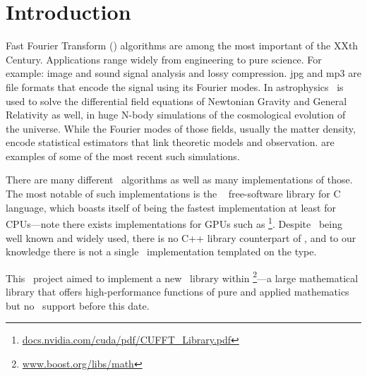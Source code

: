 \section{Introduction}

Fast Fourier Transform (\fft) algorithms are among the most important of the XXth
Century. Applications range widely from engineering to pure science.
For example: image and sound signal analysis and lossy compression.
jpg and mp3 are file formats that encode the signal using its Fourier modes.
In astrophysics \fft\ is used to solve the differential field
equations of Newtonian Gravity and General Relativity as well, in huge N-body
simulations of the cosmological evolution of the universe. While the Fourier
modes of those fields, usually the matter density, encode statistical estimators
that link theoretic models and observation. \cite{adamek_2016,springel_2020} are
examples of some of the most recent such simulations.

There are many different \fft\ algorithms as well as many implementations of
those. The most notable of such implementations is the \fftw\ \cite{FFTW05}
free-software library for C language, which boasts itself of being the fastest
implementation at least for CPUs---note there exists 
implementations for GPUs such as
\cufft\footnote{\url{docs.nvidia.com/cuda/pdf/CUFFT_Library.pdf}}.
Despite \fft\ being well known and widely used, there is no C++ library 
counterpart of \fftw,
and to our knowledge there is not a single \fft\ implementation templated on the
type.

This \gsoc\ project aimed to implement a new \fft\ library
within \boostmath\footnote{\url{www.boost.org/libs/math}}---a large mathematical
library that
offers high-performance functions of pure and applied mathematics
but no \fft\ support before this date. 
